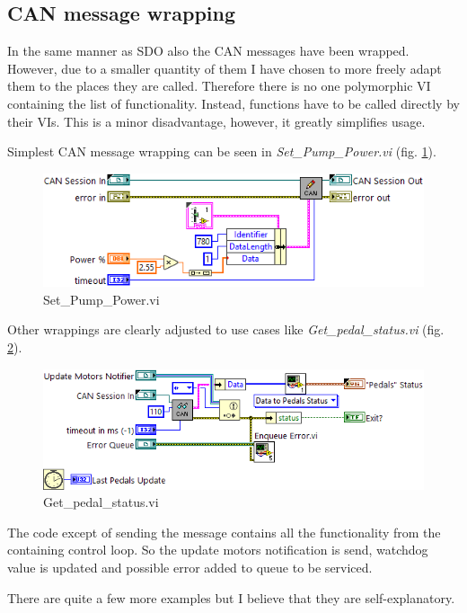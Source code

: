 \subsection{CAN message wrapping} \label{sec:CAN_wrapping}
In the same manner as SDO also the CAN messages have been wrapped. However, due to a smaller quantity of them I have chosen to more freely adapt them to the places they are called. Therefore there is no one polymorphic VI containing the list of functionality.
Instead, functions have to be called directly by their VIs. This is a minor disadvantage, however, it greatly simplifies usage.

Simplest CAN message wrapping can be seen in \textit{Set\_Pump\_Power.vi} (fig. \ref{vi:Set_Pump_Power}).
\begin{figure}[H]
    \centering
    \includegraphics[scale=\visc,max width=\textwidth]{figures/Set_Pump_Powerd}
    \caption{Set\_Pump\_Power.vi}
    \label{vi:Set_Pump_Power}
\end{figure}

Other wrappings are clearly adjusted to use cases like \textit{Get\_pedal\_status.vi} (fig. \ref{vi:Get_pedal_status}).
\begin{figure}[H]
    \centering
    \includegraphics[scale=\visc,max width=\textwidth]{figures/Get_pedal_statusd}
    \caption{Get\_pedal\_status.vi}
    \label{vi:Get_pedal_status}
\end{figure}
The code except of sending the message contains all the functionality from the containing control loop. So the update motors notification is send, watchdog value is updated and possible error added to queue to be serviced.

There are quite a few more examples but I believe that they are self-explanatory.

